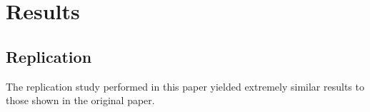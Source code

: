 \documentclass[acmconf]{acmart}
\begin{document}
\section{Results} \label{results}

\subsection{Replication}

The replication study performed in this paper yielded extremely similar results to those shown in the original paper.
\end{document}

